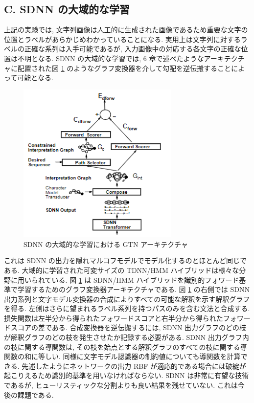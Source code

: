 \documentclass[twocolumn]{jarticle}     %
\begin{document}
\subsection*{C. SDNN の大域的な学習}
上記の実験では, 文字列画像は人工的に生成された画像であるため重要な文字の位置とラベルがあらかじめわかっていることになる. 実用上は文字列に対するラベルの正確な系列は入手可能であるが, 入力画像中の対応する各文字の正確な位置は不明となる. SDNN の大域的な学習では, 6 章で述べたようなアーキテクチャに配置された図 \ref{fig:27} のようなグラフ変換器を介して勾配を逆伝搬することによって可能となる. 
\begin{figure}[t]
  \centering
  \includegraphics[width=80mm]{assets/27.png}
  \caption{SDNN の大域的な学習における GTN アーキテクチャ}
  \label{fig:27}
\end{figure}
これは SDNN の出力を隠れマルコフモデルでモデル化するのとほとんど同じである. 大域的に学習された可変サイズの TDNN/HMM ハイブリッドは様々な分野に用いられている. 
図 \ref{fig:27} は SDNN/HMM ハイブリッドを識別的フォワード基準で学習するためのグラフ変換器アーキテクチャである. 
図 \ref{fig:27} の右側では SDNN 出力系列と文字モデル変換器の合成によりすべての可能な解釈を示す解釈グラフを得る. 左側はさらに望まれるラベル系列を持つパスのみを含む文法と合成する. 損失関数は左半分から得られたフォワードスコアと右半分から得られたフォワードスコアの差である. 
合成変換器を逆伝搬するには, SDNN 出力グラフのどの枝が解釈グラフのどの枝を発生させたか記録する必要がある. SDNN 出力グラフ内の枝に関する導関数は, その枝を始点とする解釈グラフのすべての枝に関する導関数の和に等しい. 同様に文字モデル認識器の制約値についても導関数を計算できる. 先述したようにネットワークの出力 RBF が適応的である場合には破綻が起こりえるため識別的基準を用いなければならない. 
SDNN は非常に有望な技術であるが, ヒューリスティックな分割よりも良い結果を残せていない. これは今後の課題である.
\end{document}
